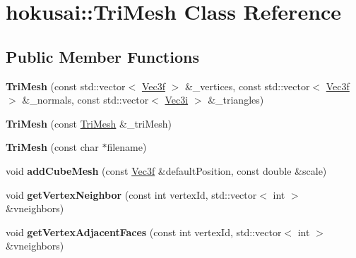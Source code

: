 \hypertarget{classhokusai_1_1TriMesh}{\section{hokusai\+:\+:Tri\+Mesh Class Reference}
\label{classhokusai_1_1TriMesh}
}
\subsection*{Public Member Functions}
\begin{DoxyCompactItemize}
\item 
\hypertarget{classhokusai_1_1TriMesh_a08aee2e9b97aad346ad33cf72983d963}{{\bfseries Tri\+Mesh} (const std\+::vector$<$ \hyperlink{classhokusai_1_1Vec3}{Vec3f} $>$ \&\+\_\+vertices, const std\+::vector$<$ \hyperlink{classhokusai_1_1Vec3}{Vec3f} $>$ \&\+\_\+normals, const std\+::vector$<$ \hyperlink{classhokusai_1_1Vec3}{Vec3i} $>$ \&\+\_\+triangles)}\label{classhokusai_1_1TriMesh_a08aee2e9b97aad346ad33cf72983d963}

\item 
\hypertarget{classhokusai_1_1TriMesh_a5416ebebbeb7fe9255ec3f9c73f7a312}{{\bfseries Tri\+Mesh} (const \hyperlink{classhokusai_1_1TriMesh}{Tri\+Mesh} \&\+\_\+tri\+Mesh)}\label{classhokusai_1_1TriMesh_a5416ebebbeb7fe9255ec3f9c73f7a312}

\item 
\hypertarget{classhokusai_1_1TriMesh_a7ea2ebddf1c6e5ea8ea0363de3164716}{{\bfseries Tri\+Mesh} (const char $\ast$filename)}\label{classhokusai_1_1TriMesh_a7ea2ebddf1c6e5ea8ea0363de3164716}

\item 
\hypertarget{classhokusai_1_1TriMesh_aa8588c3988d925ffcac6e744bad22c9c}{void {\bfseries add\+Cube\+Mesh} (const \hyperlink{classhokusai_1_1Vec3}{Vec3f} \&default\+Position, const double \&scale)}\label{classhokusai_1_1TriMesh_aa8588c3988d925ffcac6e744bad22c9c}

\item 
\hypertarget{classhokusai_1_1TriMesh_a547fb0be7eb9096dfc9d124bb51b8f37}{void {\bfseries get\+Vertex\+Neighbor} (const int vertex\+Id, std\+::vector$<$ int $>$ \&vneighbors)}\label{classhokusai_1_1TriMesh_a547fb0be7eb9096dfc9d124bb51b8f37}

\item 
\hypertarget{classhokusai_1_1TriMesh_a0b82eb1e85bdf753d765d1dc98ee5f14}{void {\bfseries get\+Vertex\+Adjacent\+Faces} (const int vertex\+Id, std\+::vector$<$ int $>$ \&vneighbors)}\label{classhokusai_1_1TriMesh_a0b82eb1e85bdf753d765d1dc98ee5f14}


\end{DoxyCompactItemize}
